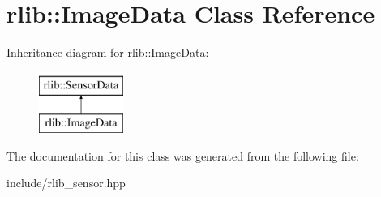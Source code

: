 \hypertarget{classrlib_1_1ImageData}{\section{rlib\-:\-:Image\-Data Class Reference}
\label{classrlib_1_1ImageData}
}
Inheritance diagram for rlib\-:\-:Image\-Data\-:\begin{figure}[H]
\begin{center}
\leavevmode
\includegraphics[height=2.000000cm]{classrlib_1_1ImageData}
\end{center}
\end{figure}


The documentation for this class was generated from the following file\-:\begin{DoxyCompactItemize}
\item 
include/rlib\-\_\-sensor.\-hpp\end{DoxyCompactItemize}

